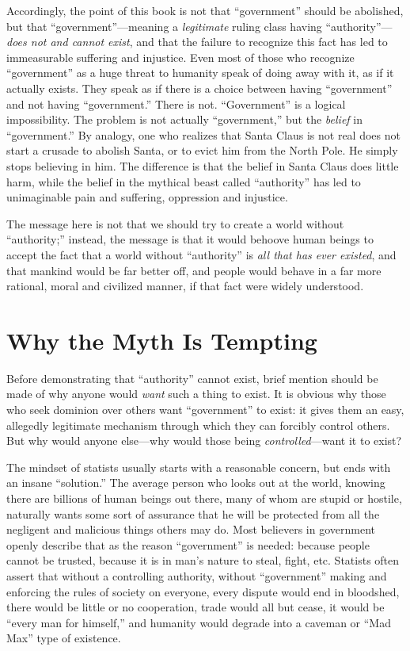 \documentclass{book}
\begin{document}
Accordingly, the point of this book is not that \enquote{government} should be abolished, but that \enquote{government}---meaning a \emph{legitimate} ruling class having \enquote{authority}---\emph{does not and cannot exist}, and that the failure to recognize this fact has led to immeasurable suffering and injustice. Even most of those who recognize \enquote{government} as a huge threat to humanity speak of doing away with it, as if it actually exists. They speak as if there is a choice between having \enquote{government} and not having \enquote{government.} There is not. \enquote{Government} is a logical impossibility. The problem is not actually \enquote{government,} but the \emph{belief} in \enquote{government.} By analogy, one who realizes that Santa Claus is not real does not start a crusade to abolish Santa, or to evict him from the North Pole. He simply stops believing in him. The difference is that the belief in Santa Claus does little harm, while the belief in the mythical beast called \enquote{authority} has led to unimaginable pain and suffering, oppression and injustice.

The message here is not that we should try to create a world without \enquote{authority;} instead, the message is that it would behoove human beings to accept the fact that a world without \enquote{authority} is \emph{all that has ever existed}, and that mankind would be far better off, and people would behave in a far more rational, moral and civilized manner, if that fact were widely understood.

\section{Why the Myth Is Tempting}

Before demonstrating that \enquote{authority} cannot exist, brief mention should be made of why anyone would \emph{want} such a thing to exist. It is obvious why those who seek dominion over others want \enquote{government} to exist: it gives them an easy, allegedly legitimate mechanism through which they can forcibly control others. But why would anyone else---why would those being \emph{controlled}---want it to exist?

The mindset of statists usually starts with a reasonable concern, but ends with an insane \enquote{solution.} The average person who looks out at the world, knowing there are billions of human beings out there, many of whom are stupid or hostile, naturally wants some sort of assurance that he will be protected from all the negligent and malicious things others may do. Most believers in government openly describe that as the reason \enquote{government} is needed: because people cannot be trusted, because it is in man's nature to steal, fight, etc. Statists often assert that without a controlling authority, without \enquote{government} making and enforcing the rules of society on everyone, every dispute would end in bloodshed, there would be little or no cooperation, trade would all but cease, it would be \enquote{every man for himself,} and humanity would degrade into a caveman or \enquote{Mad Max} type of existence.
\end{document}
